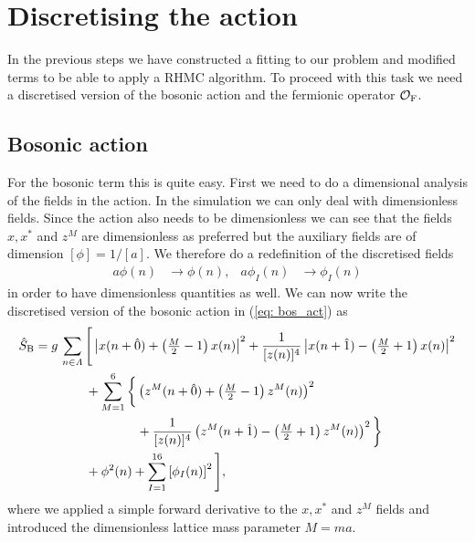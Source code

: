 \section{Discretising the action}
In the previous steps we have constructed a  fitting to our problem and modified terms to be able to apply a RHMC algorithm. To proceed with this task we need a discretised version of the bosonic action and the fermionic operator $\mathcal{O}_{\rm F}$.
%
%
%
%
%
%
\subsection{Bosonic action}
For the bosonic term this is quite easy. First we need to do a dimensional analysis of the fields in the action. In the simulation we can only deal with dimensionless fields. Since the action also needs to be dimensionless we can see that the fields $x,x^{*}$ and $z^{M}$ are dimensionless as preferred but the auxiliary fields are of dimension $[\phi]=1/[a]$. We therefore do a redefinition of the discretised fields
%
%
\begin{align}
a\phi(n) &\to \phi(n), & a\phi_{I}(n) &\to \phi_{I}(n)
\end{align}
%
%
in order to have dimensionless quantities as well. We can now write the discretised version of the bosonic action in (\ref{eq: bos_act}) as
%
%
\begin{align}
\hat{S}_{\rm B} &= g\, \sum\limits_{n\in\mathit{\Lambda}} \Bigg[ \left\vert x(n+\hat{0}) + \left(\tfrac{M}{2}-1\right) x(n) \right\vert^{2}
+ \frac{1}{[z(n)]^{4}} \left\vert x(n+\hat{1}) - \left(\tfrac{M}{2}+1\right) x(n) \right\vert^{2} \notag\\
%
%
&\qquad\qquad + \sum\limits_{M=1}^{6} \bigg\lbrace \left(z^{M}(n+\hat{0}) + \left(\tfrac{M}{2} -1\right)z^{M}(n) \right)^{2} \\
%
%
&\qquad\qquad\qquad\qquad + \frac{1}{[z(n)]^{4}} \left( z^{M}(n+\hat{1}) -\left(\tfrac{M}{2}+1\right) z^{M}(n) \right)^{2} \bigg\rbrace \notag \\
&\qquad\qquad +\phi^{2}(n) + \sum\limits_{I=1}^{16}\left[\phi_{I}(n)\right]^{2} \Bigg], \notag
\end{align}
%
%
where we applied a simple forward derivative to the $x,x^{*}$ and $z^{M}$ fields and introduced the dimensionless lattice mass parameter $M=ma$.
%
%
%
%
%
%
%
%
